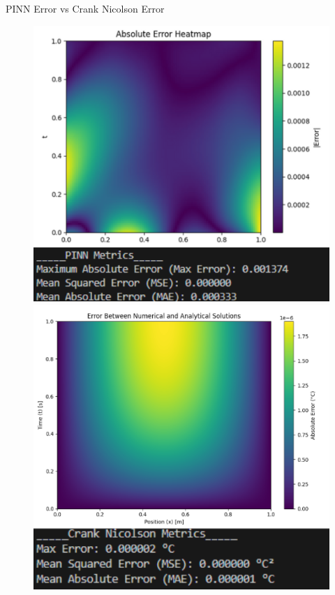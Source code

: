 \documentclass{beamer}
\begin{document}
\begin{frame}{PINN Error vs Crank Nicolson Error}
    \begin{figure}[H]
        \centering
        \begin{minipage}{0.48\textwidth}
            \centering
            \includegraphics[width=\linewidth]{PINN pres err.png}
        \end{minipage}
        \hfill
        \begin{minipage}{0.48\textwidth}
            \centering
            \includegraphics[width=\linewidth]{CN pres ERR.png}
        \end{minipage}
    \end{figure}
\end{frame}
\end{document}
